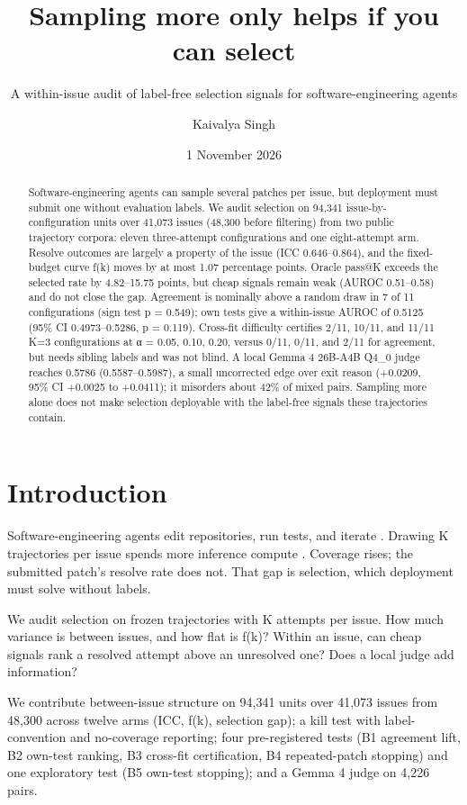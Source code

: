 \documentclass[
]{article}
\title{Sampling more only helps if you can select}
\subtitle{A within-issue audit of label-free selection signals for
software-engineering agents}
\author{Kaivalya Singh}
\date{1 November 2026}
\begin{document}
\maketitle
\begin{abstract}
Software-engineering agents can sample several patches per issue, but
deployment must submit one without evaluation labels. We audit selection
on 94,341 issue-by-configuration units over 41,073 issues (48,300 before
filtering) from two public trajectory corpora: eleven three-attempt
configurations and one eight-attempt arm. Resolve outcomes are largely a
property of the issue (ICC 0.646--0.864), and the fixed-budget curve
f(k) moves by at most 1.07 percentage points. Oracle pass@K exceeds the
selected rate by 4.82--15.75 points, but cheap signals remain weak
(AUROC 0.51--0.58) and do not close the gap. Agreement is nominally
above a random draw in 7 of 11 configurations (sign test p = 0.549); own
tests give a within-issue AUROC of 0.5125 (95\% CI 0.4973--0.5286, p =
0.119). Cross-fit difficulty certifies 2/11, 10/11, and 11/11 K=3
configurations at α = 0.05, 0.10, 0.20, versus 0/11, 0/11, and 2/11 for
agreement, but needs sibling labels and was not blind. A local Gemma 4
26B-A4B Q4\_0 judge reaches 0.5786 (0.5587--0.5987), a small uncorrected
edge over exit reason (+0.0209, 95\% CI +0.0025 to +0.0411); it
misorders about 42\% of mixed pairs. Sampling more alone does not make
selection deployable with the label-free signals these trajectories
contain.
\end{abstract}

\section{Introduction}\label{introduction}

Software-engineering agents edit repositories, run tests, and iterate
\citep{yang2024sweagent, wang2024openhands}. Drawing K trajectories per
issue spends more inference compute
\citep{brown2024monkeys, snell2024scaling}. Coverage rises; the
submitted patch's resolve rate does not. That gap is selection, which
deployment must solve without labels.

We audit selection on frozen trajectories with K attempts per issue. How
much variance is between issues, and how flat is f(k)? Within an issue,
can cheap signals rank a resolved attempt above an unresolved one? Does
a local judge add information?

We contribute between-issue structure on 94,341 units over 41,073 issues
from 48,300 across twelve arms (ICC, f(k), selection gap); a kill test
with label-convention and no-coverage reporting; four pre-registered
tests (B1 agreement lift, B2 own-test ranking, B3 cross-fit
certification, B4 repeated-patch stopping) and one exploratory test (B5
own-test stopping); and a Gemma 4 judge on 4,226 pairs.
\end{document}
